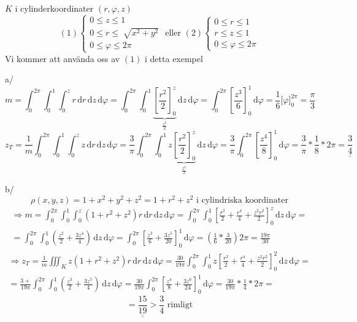 \documentclass[a4paper]{article}
\newcommand{\svar}[1]{\underline{\underline{#1}}}
\let\oldsqrt\sqrt
\renewcommand*{\sqrt}[2][\ ]{\oldsqrt[#1]{#2} }
\begin{document}
$K$ i cylinderkoordinater $(r,\varphi,z)$
$$
(1)
\begin{cases}
	0 \leq z \leq 1 \\
	0 \leq r \leq \sqrt{x^2+y^2} \\
	0 \leq \varphi \leq 2\pi
\end{cases}
\text{ eller } (2)
\begin{cases}
	0 \leq r \leq 1 \\
	r \leq z \leq 1 \\
	0 \leq \varphi \leq 2\pi
\end{cases}
$$
Vi kommer att använda oss av $(1)$ i detta exempel \newline

a/
$$
	m = \int_0^{2\pi}\int_0^1\int_0^z r \,\mathrm{d}r\,\mathrm{d}z\,\mathrm{d}\varphi =
	\int_0^{2\pi}\int_0^1 \underbrace{\left[\frac{r^2}{2}\right]_0^z}_{\frac{z^2}{2}} \,\mathrm{d}z\,\mathrm{d}\varphi =
	\int_0^{2\pi} \left[\frac{z^3}{6}\right]_0^1 \,\mathrm{d}\varphi =
	\frac{1}{6} \Big[\varphi\Big]_0^{2\pi} =
	\frac{\pi}{3}
$$
$$
	z_T = \frac{1}{m} \int_0^{2\pi}\int_0^1\int_0^z z \,\mathrm{d}r\,\mathrm{d}z\,\mathrm{d}\varphi =
	\frac{3}{\pi} \int_0^{2\pi}\int_0^1 z\underbrace{\left[\frac{r^2}{2}\right]_0^z}_\frac{z^3}{2} \,\mathrm{d}z\,\mathrm{d}\varphi =
	\frac{3}{\pi} \int_0^{2\pi} \left[\frac{z^4}{8}\right]_0^1 \,\mathrm{d}\varphi =
	\frac{3}{\pi} * \frac{1}{8} * 2\pi =
	\svar{\frac{3}{4}}
$$

b/
$$
	\rho(x,y,z) = 1 + x^2 + y^2 + z^2 = 1 + r^2 + z^2 \text{ i cylindriska koordinater}
$$
\begin{align*}
	\Rightarrow m = \int_0^{2\pi}\int_0^1\int_0^z (1+r^2+z^2)r \,\mathrm{d}r\,\mathrm{d}z\,\mathrm{d}\varphi =
	\int_0^{2\pi}\int_0^1 \left[\frac{r^2}{2} + \frac{r^4}{4} + \frac{z^2r^2}{2}\right]_0^z \,\mathrm{d}z\,\mathrm{d}\varphi = \\
	= \int_0^{2\pi}\int_0^1 \left(\frac{z^2}{2} + \frac{3z^4}{4}\right) \,\mathrm{d}z\,\mathrm{d}\varphi =
	\int_0^{2\pi} \left[\frac{z^3}{6} + \frac{3z^5}{20}\right]_0^1 \,\mathrm{d}\varphi =
	\left(\frac{1}{6}*\frac{3}{20}\right)2\pi =
	\frac{19\pi}{30}
\end{align*}
\begin{align*}
	\Rightarrow z_T = \frac{1}{m} \iiint_K z(1+r^2+z^2)r \,\mathrm{d}r\,\mathrm{d}z\,\mathrm{d}\varphi =
	\frac{30}{19\pi} \int_0^{2\pi}\int_0^1 z\left[\frac{r^2}{2} + \frac{r^4}{4} + \frac{z^2r^2}{2}\right]_0^2 \,\mathrm{d}z\,\mathrm{d}\varphi = \\
	= \frac{3+}{19\pi} \int_0^{2\pi}\int_0^1 \left(\frac{z^3}{2} + \frac{3z^5}{4}\right) \,\mathrm{d}z\,\mathrm{d}\varphi =
	\frac{30}{19\pi} \int_0^{2\pi} \left[\frac{z^4}{8} + \frac{3z^6}{24}\right]_0^1 \,\mathrm{d}\varphi =
	\frac{30}{19\pi} * \frac{1}{4} * 2\pi =
\end{align*}
$$= \svar{\frac{15}{19}} > \frac{3}{4} \text{ rimligt}$$
\end{document}
